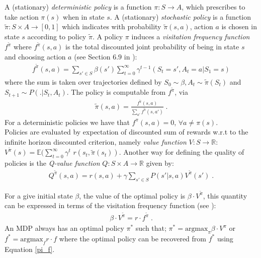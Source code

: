 \documentclass[runningheads,a4paper]{llncs}
\begin{document}
A (stationary) \textit{deterministic policy} is a function $\pi: S \longrightarrow A$, which prescribes to take action $\pi(s)$ when in state $s$. A (stationary) \textit{stochastic policy} is a function $\tilde{\pi}: S \times A \longrightarrow [0,1]$ which indicates with probability $\tilde{\pi} (s,a)$, action $a$ is chosen in state $s$ according to policy $\tilde{\pi}$. A policy $\pi$ induces a \textit{visitation frequency function} $f^{\tilde{\pi}}$ where $f^{\tilde{\pi}}(s,a)$ is the total discounted joint probability of being in state $s$ and choosing action $a$ (see Section $6.9$ in \cite{Puterman1994}):
\begin{align*}
f^{\tilde{\pi}}(s, a) = \sum_{s' \in S} \beta(s') \sum_{t=0}^{\infty} \gamma^{t-1}(S_t = s', A_t = a | S_1 = s)
\end{align*}
where the sum is taken over trajectories defined by $S_0 \sim \beta, A_t \sim \tilde{\pi}(S_t)$ and $S_{t+1} \sim P(.|S_t,A_t)$. The policy is computable from $f^{\tilde{\pi}}$, via 
\begin{align}\label{pi_f}
\tilde{\pi}(s,a) = \frac{f^{\tilde{\pi}}(s, a)}{\sum_{a'} f^{\tilde{\pi}} (s,a')}\;.
\end{align}
For a deterministic policies we have that $f^{\pi}(s,a)= 0$, $\forall a \neq \pi(s)$.\\
Policies are evaluated by expectation of discounted sum of rewards w.r.t to the infinite horizon discounted criterion, namely \textit{value function} $V: S \longrightarrow \mathbb{R}$: 
$V^{\tilde{\pi}}(s) = \mathbb{E}(\sum_{t=0}^{\infty} \gamma^{t}$ $r(s_t, \tilde{\pi}(s_t))$. %
Another way for defining the quality of policies is the \textit{Q-value function}   $Q: S \times A \longrightarrow \mathbb{R}$ given by:
\begin{align}\label{q-v}
Q^{\tilde{\pi}}(s, a) = r(s, a) + \gamma \sum_{s' \in S} P(s'|s,a)V^{\tilde{\pi}}(s')\;.
\end{align}

For a give initial state $\beta$, the value of the optimal policy is $\beta \cdot V^{\tilde{\pi}}$, this quantity can be expressed in terms of the visitation frequency function (see \cite{Puterman1994}): 
\begin{align}\label{f-v}
\beta \cdot V^{\tilde{\pi}} = r \cdot f^{\tilde{\pi}}\;.
\end{align}
An MDP always has an optimal policy $\pi^*$ such that; $\pi^* = \text{argmax}_{\pi} \beta \cdot V^{\pi}$ or $f^{*} = \text{argmax}_{f} r \cdot f$ where the optimal policy can be recovered from $f^*$ using Equation \ref{pi_f}. 
\end{document}
